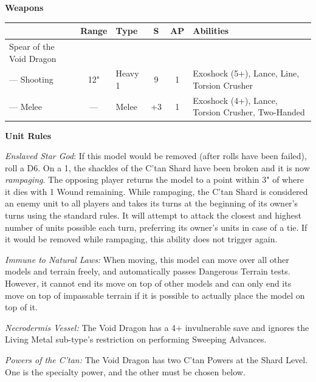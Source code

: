 \begin{minipage}[t]{0.72\textwidth}
	\vspace*{2em}
	\textbf{Weapons}
	
	\begin{tabular}{L{90 pt} c C{40pt} *{2}{c} >{\raggedright\arraybackslash}p{130pt}}
		& Range & Type & S & AP & Abilities \\
		\hline
		Spear of the Void Dragon & & & & & \\
		— Shooting & 12" & Heavy 1 & 9 & 1 & Exoshock (5+), Lance, Line, Torsion Crusher \\
		— Melee & — & Melee & +3 & 1 & Exoshock (4+), Lance, Torsion Crusher, Two-Handed \\
	\end{tabular}
	
	\vspace*{2em}
	\textbf{Unit Rules}
	
	\textit{Enslaved Star God}: If this model would be removed (after  rolls have been failed), roll a D6. On a 1, the shackles of the C'tan Shard have been broken and it is now \textit{rampaging}. The opposing player returns the model to a point within 3" of where it dies with 1 Wound remaining. While rampaging, the C'tan Shard is considered an enemy unit to all players and takes its turns at the beginning of its owner's turns using the standard rules. It will attempt to attack the closest and highest number of units possible each turn, preferring its owner's units in case of a tie. If it would be removed while rampaging, this ability does not trigger again.
	
	\textit{Immune to Natural Laws:} When moving, this model can move over all other models and terrain freely, and automatically passes Dangerous Terrain tests. However, it cannot end its move on top of other models and can only end its move on top of impassable terrain if it is possible to actually place the model on top of it.
		
	\textit{Necrodermis Vessel:} The Void Dragon has a 4+ invulnerable save and ignores the Living Metal sub-type's restriction on performing Sweeping Advances.
	
	\textit{Powers of the C'tan:} The Void Dragon has two C'tan Powers at the Shard Level. One is the  specialty power, and the other must be chosen below.
	

\end{minipage}
